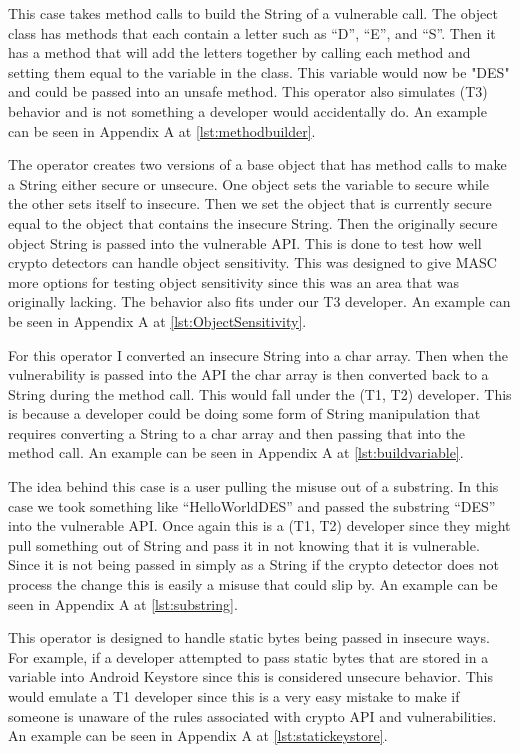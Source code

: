  This case takes method calls to build the String of a vulnerable call. The object class has methods that each contain a letter such as “D”, “E”, and “S”. Then it has a method that will add the letters together by calling each method and setting them equal to the variable in the class. This variable would now be "DES" and could be passed into an unsafe method. This operator also simulates (T3) behavior and is not something a developer would accidentally do. An example can be seen in Appendix A at \ref{lst:methodbuilder}.

 The operator creates two versions of a base object that has method calls to make a String either secure or unsecure. One object sets the variable to secure while the other sets itself to insecure. Then we set the object that is currently secure equal to the object that contains the insecure String. Then the originally secure object String is passed into the vulnerable API. This is done to test how well crypto detectors can handle object sensitivity. This was designed to give MASC more options for testing object sensitivity since this was an area that was originally lacking. The behavior also fits under our T3 developer. An example can be seen in Appendix A at  \ref{lst:ObjectSensitivity}.

 For this operator I converted an insecure String into a char array. Then when the vulnerability is passed into the API the char array is then converted back to a String during the method call. This would fall under the (T1, T2) developer. This is because a developer could be doing some form of String manipulation that requires converting a String to a char array and then passing that into the method call. An example can be seen in Appendix A at  \ref{lst:buildvariable}.

 The idea behind this case is a user pulling the misuse out of a substring. In this case we took something like “HelloWorldDES” and passed the substring “DES” into the vulnerable API. Once again this is a (T1, T2) developer since they might pull something out of String and pass it in not knowing that it is vulnerable. Since it is not being passed in simply as a String if the crypto detector does not process the change this is easily a misuse that could slip by. An example can be seen in Appendix A at  \ref{lst:substring}.

 This operator is designed to handle static bytes being passed in insecure ways. For example, if a developer attempted to pass static bytes that are stored in a variable into Android Keystore since this is considered unsecure behavior. This would emulate a T1 developer since this is a very easy mistake to make if someone is unaware of the rules associated with crypto API and vulnerabilities. An example can be seen in Appendix A at  \ref{lst:statickeystore}.



